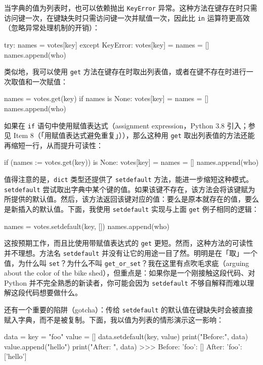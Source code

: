 当字典的值为列表时，也可以依赖抛出 \texttt{KeyError} 异常。这种方法在键存在时只需访问键一次，在键缺失时只需访问键一次并赋值一次，因此比 \texttt{in} 运算符更高效（忽略异常处理机制的开销）：

\begin{codebox}[python]
try:
    names = votes[key]
except KeyError:
    votes[key] = names = []
names.append(who)
\end{codebox}

类似地，我可以使用 \texttt{get} 方法在键存在时取出列表值，或者在键不存在时进行一次取值和一次赋值：

\begin{codebox}[python]
names = votes.get(key)
if names is None:
    votes[key] = names = []
names.append(who)
\end{codebox}

如果在 \texttt{if} 语句中使用赋值表达式（assignment expression，Python 3.8 引入；参见 Item 8（「用赋值表达式避免重复」）），那么这种用 \texttt{get} 取出列表值的方法还能再缩短一行，从而提升可读性：

\begin{codebox}[python]
if (names := votes.get(key)) is None:
    votes[key] = names = []
names.append(who)
\end{codebox}

值得注意的是，\texttt{dict} 类型还提供了 \texttt{setdefault} 方法，能进一步缩短这种模式。\texttt{setdefault} 尝试取出字典中某个键的值。如果该键不存在，该方法会将该键赋为所提供的默认值。然后，该方法返回该键对应的值：要么是原本就存在的值，要么是新插入的默认值。下面，我使用 \texttt{setdefault} 实现与上面 \texttt{get} 例子相同的逻辑：

\begin{codebox}[python]
names = votes.setdefault(key, [])
names.append(who)
\end{codebox}

这按预期工作，而且比使用带赋值表达式的 \texttt{get} 更短。然而，这种方法的可读性并不理想。方法名 \texttt{setdefault} 并没有让它的用途一目了然。明明是在「取」一个值，为什么叫 \texttt{set}？为什么不叫 \texttt{get\_or\_set}？我在这里有点吹毛求疵（arguing about the color of the bike shed），但重点是：如果你是一个刚接触这段代码、对 Python 并不完全熟悉的新读者，你可能会因为 \texttt{setdefault} 不够自解释而难以理解这段代码想要做什么。

还有一个重要的陷阱（gotcha）：传给 \texttt{setdefault} 的默认值在键缺失时会被直接赋入字典，而不是被复制。下面，我以值为列表的情形演示这一影响：

\begin{codebox}[python]
data = {}
key = "foo"
value = []
data.setdefault(key, value)
print("Before:", data)
value.append("hello")
print("After: ", data)
>>>
Before: {'foo': []}
After:  {'foo': ['hello']}
\end{codebox}

